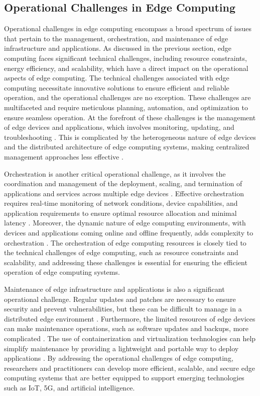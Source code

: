 \documentclass[11pt,a4paper]{article}
\begin{document}
\subsection{Operational Challenges in Edge Computing}


Operational challenges in edge computing encompass a broad spectrum of issues that pertain to the management, orchestration, and maintenance of edge infrastructure and applications. As discussed in the previous section, edge computing faces significant technical challenges, including resource constraints, energy efficiency, and scalability, which have a direct impact on the operational aspects of edge computing. The technical challenges associated with edge computing necessitate innovative solutions to ensure efficient and reliable operation, and the operational challenges are no exception. These challenges are multifaceted and require meticulous planning, automation, and optimization to ensure seamless operation. At the forefront of these challenges is the management of edge devices and applications, which involves monitoring, updating, and troubleshooting \cite{arxiv:1702.05309}. This is complicated by the heterogeneous nature of edge devices and the distributed architecture of edge computing systems, making centralized management approaches less effective \cite{arxiv:1805.06695}.

Orchestration is another critical operational challenge, as it involves the coordination and management of the deployment, scaling, and termination of applications and services across multiple edge devices \cite{arxiv:1912.08530}. Effective orchestration requires real-time monitoring of network conditions, device capabilities, and application requirements to ensure optimal resource allocation and minimal latency \cite{arxiv:1810.00305}. Moreover, the dynamic nature of edge computing environments, with devices and applications coming online and offline frequently, adds complexity to orchestration \cite{arxiv:1807.00976}. The orchestration of edge computing resources is closely tied to the technical challenges of edge computing, such as resource constraints and scalability, and addressing these challenges is essential for ensuring the efficient operation of edge computing systems.

Maintenance of edge infrastructure and applications is also a significant operational challenge. Regular updates and patches are necessary to ensure security and prevent vulnerabilities, but these can be difficult to manage in a distributed edge environment \cite{arxiv:2206.07164}. Furthermore, the limited resources of edge devices can make maintenance operations, such as software updates and backups, more complicated \cite{arxiv:1701.01090}. The use of containerization and virtualization technologies can help simplify maintenance by providing a lightweight and portable way to deploy applications \cite{arxiv:1911.02794}. By addressing the operational challenges of edge computing, researchers and practitioners can develop more efficient, scalable, and secure edge computing systems that are better equipped to support emerging technologies such as IoT, 5G, and artificial intelligence.
\end{document}
